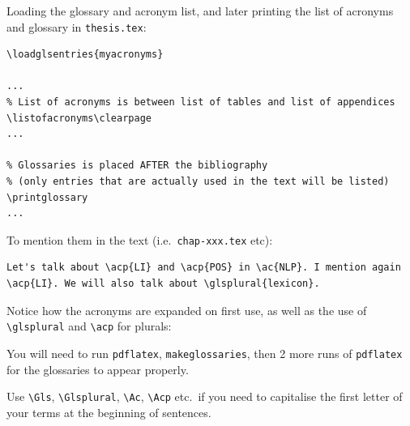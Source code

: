 Loading the glossary and acronym list, and later printing the list of acronyms and glossary in \texttt{thesis.tex}:


\begin{lstlisting}[moretexcs={loadglsentries,printglossaries,listofacronyms}]
% Must be loaded BEFORE !
\loadglsentries{myacronyms}

...
% List of acronyms is between list of tables and list of appendices
\listofacronyms\clearpage
...

% Glossaries is placed AFTER the bibliography
% (only entries that are actually used in the text will be listed)
\printglossary
...
\end{lstlisting}


To mention them in the text (i.e.~\texttt{chap-xxx.tex} etc):


\begin{lstlisting}[frame=single]
Let's talk about \acp{LI} and \acp{POS} in \ac{NLP}. I mention again \acp{LI}. We will also talk about \glsplural{lexicon}.
\end{lstlisting}


Notice how the acronyms are expanded on first use, as well as the use of \verb|\glsplural| and \verb|\acp| for plurals:


{\fboxsep=12pt\SingleSpacing
\noindent{}
}

You will need to run \texttt{pdflatex}, \texttt{makeglossaries}, then 2 more runs of \texttt{pdflatex} for the glossaries to appear properly.

Use \verb|\Gls|, \verb|\Glsplural|, \verb|\Ac|, \verb|\Acp| etc.~if you need to capitalise the first letter of your terms at the beginning of sentences.
